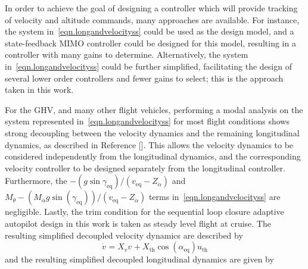 \documentclass[]{../sty/aiaa-tc}
\theoremstyle{examplestyle}
\begin{document}
  In order to achieve the goal of designing a controller which will provide tracking of velocity and altitude commands, many approaches are available.
  For instance, the system in\ \eqref{eqn.longandvelocityss} could be used as the design model, and a state-feedback MIMO controller could be designed for this model, resulting in a controller with many gains to determine.
  Alternatively, the system in\ \eqref{eqn.longandvelocityss} could be further simplified, facilitating the design of several lower order controllers and fewer gains to select; this is the approach taken in this work.

  For the GHV, and many other flight vehicles, performing a modal analysis on the system represented in\ \eqref{eqn.longandvelocityss} for most flight conditions shows strong decoupling between the velocity dynamics and the remaining longitudinal dynamics, as described in Reference [].
  This allows the velocity dynamics to be considered independently from the longitudinal dynamics, and the corresponding velocity controller to be designed separately from the longitudinal controller.
  Furthermore, the $-(g\sin{\gamma_{\text{eq}}})/(v_{\text{eq}}-Z_{\dot{\alpha}})$ and $M_{\theta}-(M_{\dot{\alpha}}g\sin(\gamma_{\text{eq}}))/(v_{\text{eq}}-Z_{\dot{\alpha}})$ terms in\ \eqref{eqn.longandvelocityss} are negligible.
  Lastly, the trim condition for the sequential loop closure adaptive autopilot design in this work is taken as steady level flight at cruise.
  The resulting simplified decoupled velocity dynamics are described by
  \begin{equation}
    \label{eqn.velocityss}
    \dot{v}_{} = X_{v}v_{} + X_{\text{th}}\cos(\alpha_{\text{eq}})u_{\text{th}}
  \end{equation}
  and the resulting simplified decoupled longitudinal dynamics are given by
\end{document}
